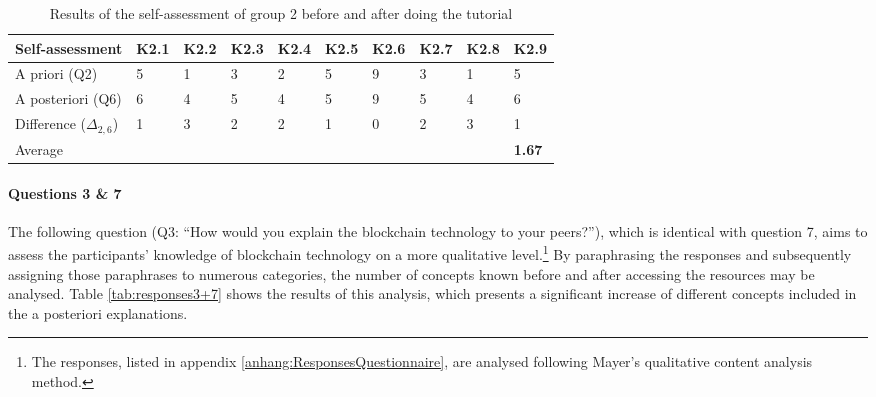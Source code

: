 \begin{table}[]
    \centering
    \begin{tabular}{l | l l l l l l l l l }
         Self-assessment & K2.1 & K2.2 & K2.3 & K2.4 & K2.5 & K2.6 & K2.7 & K2.8 & K2.9  \\
         \hline
         A priori (Q2) & 5 & 1 & 3 & 2 & 5 & 9 & 3 & 1 & 5 \\
         A posteriori (Q6) & 6 & 4 & 5 & 4 & 5 & 9 & 5 & 4 & 6 \\
         \hline
         Difference ($\Delta_{2,6}$) & 1 & 3 & 2 & 2 & 1 & 0 & 2 & 3 & 1 \\
         Average & & & & & & & & & \cellcolor[gray]{0.9} \textbf{1.67} \\
    \end{tabular}
    \caption{Results of the self-assessment of group 2 before and after doing the tutorial}
    \label{tab:EvalResultsYesNoTUTORIAL}
\end{table}

\paragraph{Questions 3 \& 7} The following question (Q3: \enquote{How would you explain the blockchain technology to your peers?}), which is identical with question 7, aims to assess the participants' knowledge of blockchain technology on a more qualitative level.\footnote{The responses, listed in appendix \ref{anhang:ResponsesQuestionnaire}, are analysed following Mayer's qualitative content analysis method.} By paraphrasing the responses and subsequently assigning those paraphrases to numerous categories, the number of concepts known before and after accessing the resources may be analysed. Table \ref{tab:responses3+7} shows the results of this analysis, which presents a significant increase of different concepts included in the a posteriori explanations.

